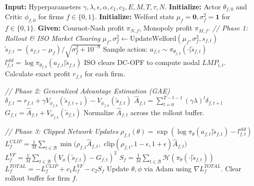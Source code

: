 \documentclass[lettersize,journal]{IEEEtran}
\begin{document}
\begin{algorithm}[H]
\caption{Tacit Collusion with PPO}\label{alg:ppo_collusion}
\begin{algorithmic}[1]
\STATE \textbf{Input:} Hyperparameters $\gamma, \lambda, \epsilon, \alpha, c_1, c_2, E, M, T, \tau, N$.
\STATE \textbf{Initialize:} Actor $\theta_{f,0}$ and Critic $\phi_{f,0}$ for firms $f \in \{0, 1\}$.
\STATE \textbf{Initialize:} Welford stats $\mu_f=\mathbf{0}, \sigma^2_f=\mathbf{1}$ for $f \in \{0, 1\}$.
\STATE \textbf{Given:} Cournot-Nash profit $\pi_{N,f}$, Monopoly profit $\pi_{M,f}$.
    \STATE \textit{// Phase 1: Rollout \& ISO Market Clearing}
            \STATE $\mu_f, \sigma^2_f \gets \text{UpdateWelford}(\mu_f, \sigma^2_f, s_{f,t})$
            \STATE $\tilde{s}_{f,t} = (s_{f,t} - \mu_f)/\sqrt{\sigma^2_f + 10^{-8}}$
            \STATE Sample action: $a_{f,t} \sim \pi_{\theta_{f,k}}(\cdot | \tilde{s}_{f,t})$
            \STATE $l_{f,t}^{old} = \log \pi_{\theta_{f,k}}(a_{f,t} | \tilde{s}_{f,t})$
        \ENDFOR
        \STATE ISO clears DC-OPF to compute nodal $LMP_{i,t}$.
        \STATE Calculate exact profit $r_{f,t}$ for each firm.
    \ENDFOR

    \STATE \textit{// Phase 2: Generalized Advantage Estimation (GAE)}
        \STATE $\delta_{f,t} = r_{f,t} + \gamma V_{\phi_{f,k}}(\tilde{s}_{f,t+1}) - V_{\phi_{f,k}}(\tilde{s}_{f,t})$
        \STATE $\hat{A}_{f,t} = \sum_{l=0}^{T-t-1} (\gamma \lambda)^l \delta_{f,t+l}$
        \STATE $G_{f,t} = \hat{A}_{f,t} + V_{\phi_{f,k}}(\tilde{s}_{f,t})$
        \STATE Normalize $\hat{A}_{f,t}$ across the rollout buffer.
    \ENDFOR

    \STATE \textit{// Phase 3: Clipped Network Updates}
                \STATE $\rho_{f,t}(\theta) = \exp\left( \log \pi_{\theta}(a_{f,t}|\tilde{s}_{f,t}) - l_{f,t}^{old} \right)$
                \STATE $L_f^{CLIP} = \frac{1}{M} \sum_{t \in \mathcal{B}} \min \Big( \rho_{f,t} \hat{A}_{f,t}, $
                \STATE \hspace{1cm} $\text{clip}(\rho_{f,t}, 1-\epsilon, 1+\epsilon) \hat{A}_{f,t} \Big)$
                \STATE $L_f^{VF} = \frac{1}{M} \sum_{t \in \mathcal{B}} \left( V_{\phi}(\tilde{s}_{f,t}) - G_{f,t} \right)^2$
                \STATE $S_f = \frac{1}{M} \sum_{t \in \mathcal{B}} \mathcal{H}(\pi_{\theta}(\cdot | \tilde{s}_{f,t}))$
                \STATE $L_f^{TOTAL} = - L_f^{CLIP} + c_1 L_f^{VF} - c_2 S_f$
                \STATE Update $\theta, \phi$ via Adam using $\nabla L_f^{TOTAL}$.
            \ENDFOR
        \ENDFOR
        \STATE Clear rollout buffer for firm $f$.
    \ENDFOR


\end{algorithmic}
\end{algorithm}
\end{document}
